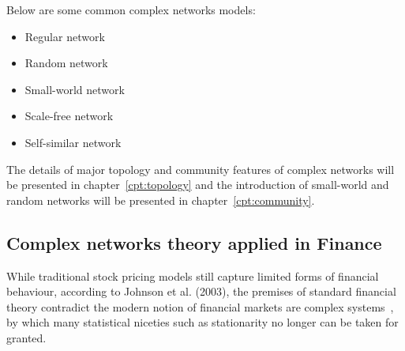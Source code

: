 \vline

Below are some common complex networks models:

\begin{itemize}
	\item Regular network
	\item Random network
	\item Small-world network
	\item Scale-free network
	\item Self-similar network
\end{itemize}

The details of major topology and community features of complex networks will be presented in chapter~\ref{cpt:topology} and the introduction of small-world and random networks will be presented in chapter~\ref{cpt:community}.

\subsection{Complex networks theory applied in Finance}
While traditional stock pricing models still capture limited forms of financial behaviour, according to Johnson et al. (2003), the premises of standard financial theory contradict the modern notion of financial markets are complex systems~\cite{financialcomplex}, by which many statistical niceties such as stationarity no longer can be taken for granted.

